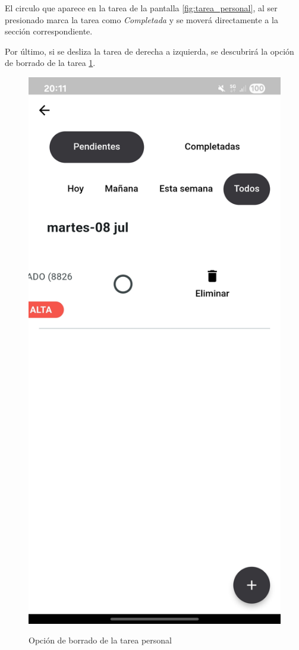 El circulo que aparece en la tarea de la pantalla \ref{fig:tarea_personal}, al ser presionado marca la tarea como \textit{Completada} y se moverá directamente a la sección correspondiente.

Por último, si se desliza la tarea de derecha a izquierda, se descubrirá la opción de borrado de la tarea \ref{fig:eliminar_tarea}.
\begin{figure}[H]
    \centering
    {\includegraphics[width=0.25\linewidth]{img/eliminar_tarea.jpg}}
     {\caption{Opción de borrado de la tarea personal}
     \label{fig:eliminar_tarea}}
\end{figure}